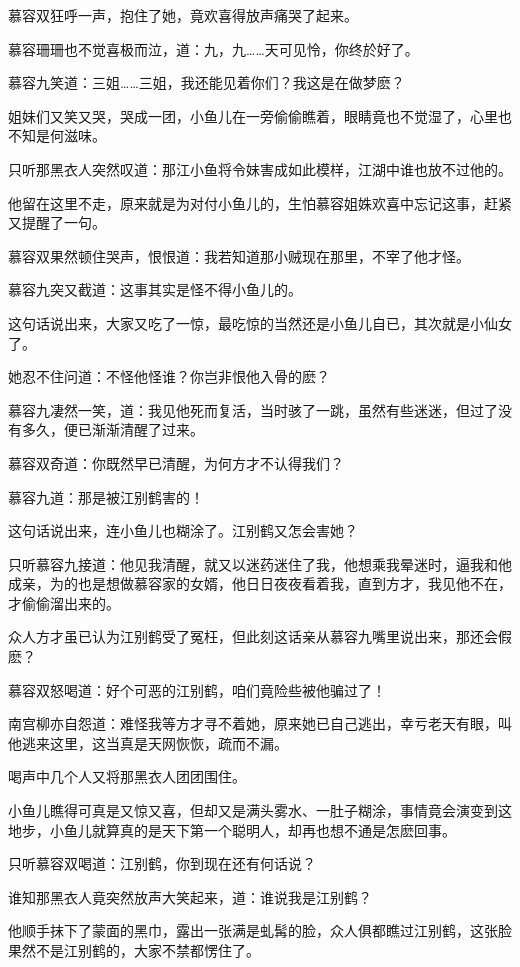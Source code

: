 \documentclass[12pt,oneside]{book}
\begin{document}
慕容双狂呼一声，抱住了她，竟欢喜得放声痛哭了起来。

慕容珊珊也不觉喜极而泣，道：九，九\ldots\ldots 天可见怜，你终於好了。

慕容九笑道：三姐\ldots\ldots 三姐，我还能见着你们？我这是在做梦麽？

姐妹们又笑又哭，哭成一团，小鱼儿在一旁偷偷瞧着，眼睛竟也不觉湿了，心里也不知是何滋味。

只听那黑衣人突然叹道：那江小鱼将令妹害成如此模样，江湖中谁也放不过他的。

他留在这里不走，原来就是为对付小鱼儿的，生怕慕容姐姝欢喜中忘记这事，赶紧又提醒了一句。

慕容双果然顿住哭声，恨恨道：我若知道那小贼现在那里，不宰了他才怪。

慕容九突又截道：这事其实是怪不得小鱼儿的。

这句话说出来，大家又吃了一惊，最吃惊的当然还是小鱼儿自已，其次就是小仙女了。

她忍不住问道：不怪他怪谁？你岂非恨他入骨的麽？

慕容九凄然一笑，道：我见他死而复活，当时骇了一跳，虽然有些迷迷，但过了没有多久，便已渐渐清醒了过来。

慕容双奇道：你既然早已清醒，为何方才不认得我们？

慕容九道：那是被江别鹤害的！

这句话说出来，连小鱼儿也糊涂了。江别鹤又怎会害她？

只听慕容九接道：他见我清醒，就又以迷药迷住了我，他想乘我晕迷时，逼我和他成亲，为的也是想做慕容家的女婿，他日日夜夜看着我，直到方才，我见他不在，才偷偷溜出来的。

众人方才虽已认为江别鹤受了冤枉，但此刻这话亲从慕容九嘴里说出来，那还会假麽？

慕容双怒喝道：好个可恶的江别鹤，咱们竟险些被他骗过了！

南宫柳亦自怨道：难怪我等方才寻不着她，原来她已自己逃出，幸亏老天有眼，叫他逃来这里，这当真是天网恢恢，疏而不漏。

喝声中几个人又将那黑衣人团团围住。

小鱼儿瞧得可真是又惊又喜，但却又是满头雾水、一肚子糊涂，事情竟会演变到这地步，小鱼儿就算真的是天下第一个聪明人，却再也想不通是怎麽回事。

只听慕容双喝道：江别鹤，你到现在还有何话说？

谁知那黑衣人竟突然放声大笑起来，道：谁说我是江别鹤？

他顺手抹下了蒙面的黑巾，露出一张满是虬髯的脸，众人俱都瞧过江别鹤，这张脸果然不是江别鹤的，大家不禁都愣住了。
\end{document}
